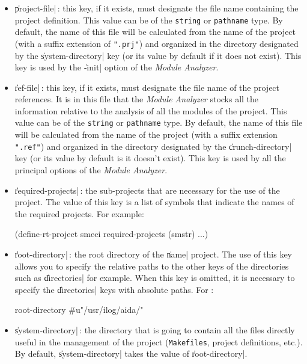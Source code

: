 \begin{itemize}
\item {\Large \|project-file|}\,: this key, if it exists, must designate the file name containing the project definition.
This value can be of the {\tt string} or {\tt pathname} type.  By default, the name of this file will be calculated from the name of the project (with a suffix extension of {\tt ".prj"}) and organized in the directory designated by the \|system-directory| key (or its value by default if it does not exist).  This key is used by the \|-init| option of the {\em Module Analyzer}.

\item {\Large \|ref-file|}\,: this key, if it exists, must designate the file name of the project references.
It is in this file that the {\em Module Analyzer} stocks all the information relative to the analysis of all the modules of the project.  This value can be of the {\tt string} or {\tt pathname} type.
By default, the name of this file will be calculated from the name of the project (with a suffix extension {\tt ".ref"}) and organized in the directory designated by the \|crunch-directory| key (or its value by default is it doesn't exist).  This key is used by all the principal options of the {\em Module Analyzer}.

\item {\Large \|required-projects|}\,: the sub-projects that are necessary for the use of the project.  The value 
of this key is a list of symbols that indicate the names of 
the required projects.  For example:

\begin{Code*}
(define-rt-project smeci
        required-projects (smstr)
        ...)
\end{Code*}


\item {\Large \|root-directory|}\,: the root directory of the \|name| project.
The use of this key allows you to specify the relative paths to the other keys
of the directories such as \|directories| for example.  When this key is omitted, it is necessary to specify the \|directories| keys with absolute paths.  For \Aida:

\begin{Code*}
root-directory #u"/usr/ilog/aida/"
\end{Code*}

\item {\Large \|system-directory|}\,: the directory that is going to contain all the files directly useful in the management of the project ({\tt Makefiles}, project definitions, etc.). By default,
\|system-directory| takes the value of \|root-directory|.

\end{itemize}

